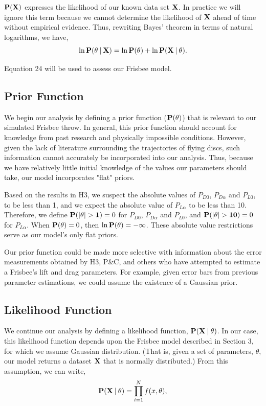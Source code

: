 \documentclass[a4paper,12pt, oneside]{article}
\newcommand\givenbase[1][]{\:#1\lvert\:}
\let\given\givenbase
\begin{document}
$\bold{P(\bold{X})}$ expresses the likelihood of our known data set $\bold{X}$. In practice we will ignore this term because we cannot determine the likelihood of $\bold{X}$ ahead of time without empirical evidence. Thus, rewriting Bayes' theorem in terms of natural logarithms, we have,
\begin{equation}
\ln\bold{P}(\theta\given\bold{X})=\ln{\bold{P(\theta})+\ln\bold{P({X}\given\theta})}.
\end{equation}

Equation 24 will be used to assess our Frisbee model.
\subsection{Prior Function}
We begin our analysis by defining a prior function ($\bold{P(\theta)}$) that is relevant to our simulated Frisbee throw. In general, this prior function should account for knowledge from past research and physically impossible conditions. However, given the lack of literature surrounding the trajectories of flying discs, such information cannot accurately be incorporated into our analysis.  Thus, because we have relatively little initial knowledge of the values our parameters should take, our model incorporates "flat" priors. 

Based on the results in H3, we suspect the absolute values of $P_{D0}$, $P_{D\alpha}$ and $P_{L0}$, to be less than 1, and we expect the absolute value of $P_{L\alpha}$ to be less than 10. Therefore, we define $\bold{P(\left|\theta\right|>1)}=0$ for $P_{D0}$, $P_{D\alpha}$ and $P_{L0}$, and $\bold{P(\left|\theta\right|>10)}=0$ for $P_{L\alpha}$. When  $\bold{P(\theta)}=0$, then $\ln\bold{P(\theta)}=-\infty$. These absolute value restrictions serve as our model's only flat priors.

Our prior function could be made more selective with information about the error measurements obtained by H3, P\&C, and others who have attempted to estimate a Frisbee's lift and drag parameters. For example, given error bars from previous parameter estimations, we could assume the existence of a Gaussian prior. 
\subsection{Likelihood Function}

We continue our analysis by defining a likelihood function, $\bold{P({X}\given\theta})$. In our case, this likelihood function depends upon the Frisbee model described in Section 3, for which we assume Gaussian distribution. (That is, given a set of parameters, $\theta$, our model returns a dataset $\bold{X}$ that is normally distributed.) From this assumption, we can write, 
\begin{equation}
\bold{P({X}\given\theta)}={\prod_{i=1}^{N} f(x,\theta)},
\end{equation}
\end{document}
